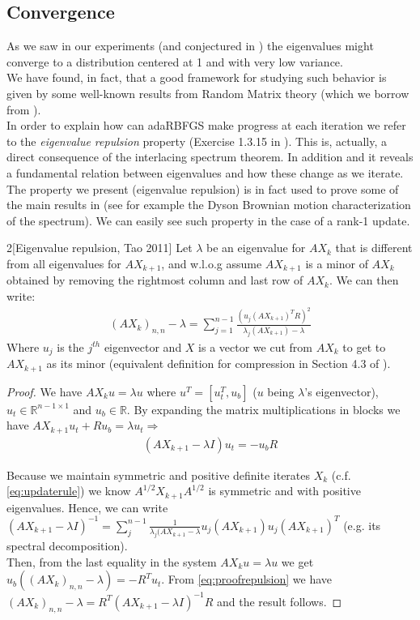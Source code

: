 \documentclass[12pt,conference,compsocconf]{IEEEtran}
\newcommand{\R}{\mathbb{R}}
\begin{document}
\subsection{Convergence}\label{sect:convergence}
As we saw in our experiments (and conjectured in \cite{Gower1}) the eigenvalues might converge to a distribution centered at 1 and with very low variance.\\
We have found, in fact, that a good framework for studying such behavior is given by some well-known results from Random Matrix theory (which we borrow from \cite{Tao}).\\
In order to explain how can adaRBFGS make progress at each iteration we refer to the \textit{eigenvalue repulsion} property (Exercise 1.3.15 in \cite{Tao}). This is, actually, a direct consequence of the interlacing spectrum theorem. In addition and it reveals a fundamental relation between eigenvalues and how these change as we iterate. The property we present (eigenvalue repulsion) is in fact used to prove some of the main results in \cite{Tao} (see for example the Dyson Brownian motion characterization of the spectrum). We can easily see such property in the case of a rank-1 update. 
\begin{customcorollary}{2}[Eigenvalue repulsion, Tao 2011]
Let $\lambda$ be an eigenvalue for $AX_{k}$ that is different from all eigenvalues for $AX_{k+1}$, and w.l.o.g assume $AX_{k+1}$ is a minor of $AX_k$ obtained by removing the rightmost column and last row of $AX_k$. We can then write:
\begin{align}\label{eq:eigvalequation}
	(AX_{k})_{n,n}-\lambda = \sum_{j=1}^{n-1}\frac{(u_j(AX_{k+1})^TR)^2}{\lambda_j(AX_{k+1})-\lambda}
\end{align}
Where $u_j$ is the $j^{th}$ eigenvector and $X$ is a vector we cut from $AX_k$ to get to $AX_{k+1}$ as its minor (equivalent definition for compression in Section 4.3 of \cite{Horn}).

\begin{proof}
We have $AX_ku=\lambda u$ where $u^T=[u_t^T ,u_b]$ ($u$ being $\lambda$'s eigenvector), $u_t \in \R^{n-1\times 1}$ and $u_b \in \R$.
 By expanding the matrix multiplications in blocks we have $AX_{k+1}u_t + Ru_b = \lambda u_t \Rightarrow$ 
\begin{align}\label{eq:proofrepulsion}
	(AX_{k+1}-\lambda I)u_t= -u_bR
\end{align}

Because we maintain symmetric and positive definite iterates $X_k$ (c.f. \eqref{eq:updaterule}) we know $A^{1/2}X_{k+1}A^{1/2}$ is symmetric and with positive eigenvalues. Hence, we can write $(AX_{k+1}-\lambda I)^{-1}=\sum_j^{n-1} \frac{1}{\lambda_j(AX_{k+1}-\lambda} u_j(AX_{k+1})u_j(AX_{k+1})^T$ (e.g. its spectral decomposition).\\
Then, from the last equality in the system $AX_ku=\lambda u$ we get $u_b((AX_k)_{n,n}-\lambda)=-R^Tu_t$. From \eqref{eq:proofrepulsion} we have $(AX_k)_{n,n}-\lambda=R^T(AX_{k+1}-\lambda I)^{-1}R$ and the result follows.
\end{proof}
\end{customcorollary}
\end{document}
